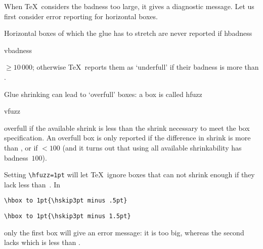 \documentclass{book}
\begin{document}
When \TeX\ considers the badness too large,
it gives a diagnostic message. Let us first consider error reporting
for horizontal boxes.

Horizontal boxes of which the glue has to stretch are never reported if
\cstoidx hbadness\par\cstoidx vbadness\par
{}${}\geq10\,000$; otherwise \TeX\ reports them
as `underfull' if their badness is more than .

Glue shrinking can lead to `overfull' boxes: a box is called
\cstoidx hfuzz\par\cstoidx vfuzz\par
overfull if the available shrink is less than the shrink
necessary to meet the box specification. An overfull box
is only reported if the difference in shrink is more than
, or if ${}<100$ (and it turns out that
using all available shrinkability has badness~$100$).

\begin{example} Setting \verb>\hfuzz=1pt> will let \TeX\ ignore
boxes that can not shrink enough if they lack less than~\n{1pt}.
In
\begin{verbatim}
\hbox to 1pt{\hskip3pt minus .5pt}
\end{verbatim}
\begin{verbatim}
\hbox to 1pt{\hskip3pt minus 1.5pt}
\end{verbatim}
only the first box will give an error message:
it is \n{1.5pt} too big, whereas the second lacks
\n{.5pt} which is less than .
\end{example}
\end{document}
